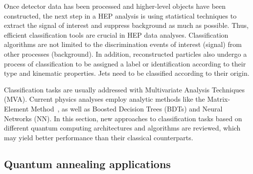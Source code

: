 Once detector data has been processed and higher-level objects have been constructed, the next step in a HEP analysis is using statistical techniques to extract the signal of interest and suppress background as much as possible. Thus, efficient classification tools are crucial in HEP data analyses. Classification algorithms are not limited to the discrimination events of interest (signal) from other processes (background). In addition, reconstructed particles also undergo a process of classification to be assigned a label or identification according to their type and kinematic properties. Jets need to be classified according to their origin. 

Classification tasks are usually addressed with Multivariate Analysis Techniques (MVA).
Current physics analyses employ analytic methods like the Matrix-Element Method~\cite{Artoisenet2013}, as well as Boosted Decision Trees (BDTs) and Neural Networks (NN).
In this section, new approaches to classification tasks based on different quantum computing architectures and algorithms are reviewed, which may yield better performance than their classical counterparts.

\subsection{Quantum annealing applications}
\label{sec:anneal}

